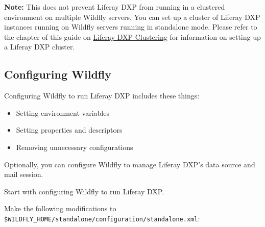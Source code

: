 \noindent\hrulefill

\textbf{Note:} This does not prevent Liferay DXP from running in a
clustered environment on multiple Wildfly servers. You can set up a
cluster of Liferay DXP instances running on Wildfly servers running in
standalone mode. Please refer to the chapter of this guide on
\href{/docs/7-1/deploy/-/knowledge_base/d/liferay-clustering}{Liferay
DXP Clustering} for information on setting up a Liferay DXP cluster.

\noindent\hrulefill

\subsection{Configuring Wildfly}\label{configuring-wildfly}

Configuring Wildfly to run Liferay DXP includes these things:

\begin{itemize}
\tightlist
\item
  Setting environment variables
\item
  Setting properties and descriptors
\item
  Removing unnecessary configurations
\end{itemize}

Optionally, you can configure Wildfly to manage Liferay DXP's data
source and mail session.

Start with configuring Wildfly to run Liferay DXP.

Make the following modifications to
\texttt{\$WILDFLY\_HOME/standalone/configuration/standalone.xml}:

